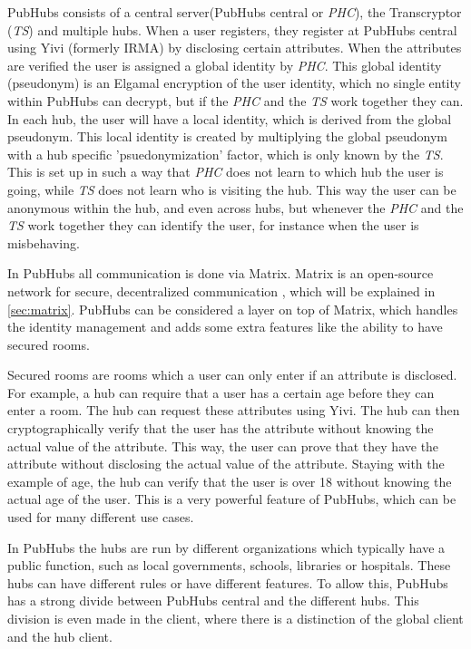 \documentclass{report}
\begin{document}
PubHubs consists of a central server(PubHubs central or \textit{PHC}), the Transcryptor (\textit{TS}) and multiple
hubs.
When a user registers, they register at PubHubs central using Yivi (formerly IRMA)\cite{alpar_irma_nodate} by disclosing
certain attributes. When the attributes are verified the user is assigned a global identity by \textit{PHC}.
This global identity (pseudonym) is an Elgamal encryption of the user identity, which no single entity within PubHubs
can decrypt, but if the \textit{PHC} and the \textit{TS} work together they can. In each hub, the user will have a
local identity, which is derived from the global pseudonym. This local identity is created by multiplying the
global pseudonym with a hub specific 'psuedonymization' factor, which is only known by the \textit{TS}. This is set
up in such a way that \textit{PHC} does not learn to which hub the user is going, while \textit{TS} does not learn
who is visiting the hub. This way the user can be anonymous within the hub, and even across hubs, but whenever the
\textit{PHC} and the \textit{TS} work together they can identify the user, for instance when the user is misbehaving.

In PubHubs all communication is done via Matrix. Matrix is an open-source network for secure, decentralized
communication \cite{noauthor_matrixorg_nodate}, which will be explained in \autoref{sec:matrix}. PubHubs can be considered a
layer on top of Matrix, which handles the identity management and adds some extra features like the ability to have
secured rooms.

Secured rooms are rooms which a user can only enter if an attribute is disclosed. For example, a hub can require
that a user has a certain age before they can enter a room. The hub can request these attributes using Yivi. The hub
can then cryptographically verify that the user has the attribute without knowing the actual
value of the attribute. This way, the user can prove that they have the attribute without disclosing the actual
value of the attribute. Staying with the example of age, the hub can verify that the user is over 18 without knowing
the actual age of the user. This is a very powerful feature of PubHubs, which can be used for many different use cases.

In PubHubs the hubs are run by different organizations which typically have a public function, such as
local governments, schools, libraries or hospitals.
These hubs can have different rules or have different features.
To allow this, PubHubs has a strong divide between PubHubs central and the different hubs.
This division is even made in the client, where there is a distinction of the global client and the hub client.
\end{document}
